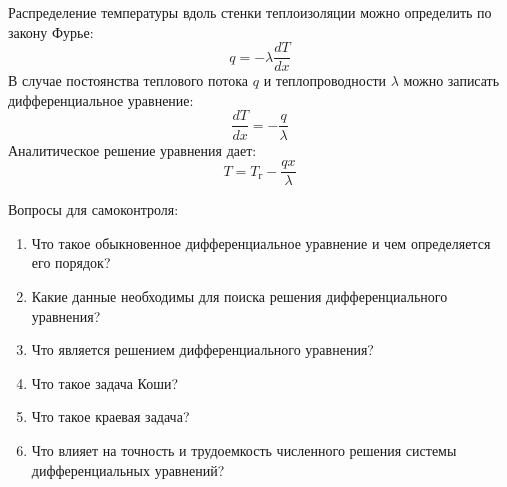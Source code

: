 
Распределение температуры вдоль стенки теплоизоляции можно определить по закону Фурье:
\begin{equation}
q=-\lambda \dfrac{d T}{d x}
\end{equation} 
В случае постоянства теплового потока $q$ и теплопроводности $\lambda$ можно записать дифференциальное уравнение:
\begin{equation}
\dfrac{d T}{d x} =- \dfrac{q}{\lambda}
\end{equation}
Аналитическое решение уравнения дает:
\begin{equation}
T = T_г - \dfrac{q x}{\lambda}
\end{equation}

Вопросы для самоконтроля:
\begin{enumerate}
	\item Что такое обыкновенное дифференциальное уравнение и чем определяется его порядок?
	\item Какие данные необходимы для поиска решения дифференциального уравнения?
	\item Что является решением дифференциального уравнения?
	\item Что такое задача Коши?
	\item Что такое краевая задача?
	\item Что влияет на точность и трудоемкость численного решения системы дифференциальных уравнений?
\end{enumerate}

